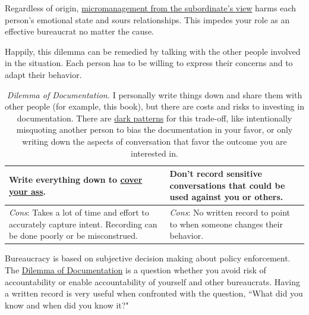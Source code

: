 Regardless of origin, \href{table:solution-provider}{micromanagement from the subordinate's view} harms each person's emotional state and sours relationships. This impedes your role as an effective bureaucrat no matter the cause.

Happily, this dilemma can be remedied by talking with the other people involved in the situation. Each person has to be willing to express their concerns and to adapt their behavior. 

\begin{center}
\begin{table}[H] %
\begin{tabular}{ | m{\dilemmatablewidth}| m{\dilemmatablewidth} | } 
  \hline
  \textbf{Write everything down to \href{https://en.wikipedia.org/wiki/Cover_your_ass}{cover your ass}.} &
  \textbf{Don't record sensitive conversations that could be used against you or others.} \\
  \hline
  \textit{Cons}: Takes a lot of time and effort to accurately capture intent. Recording can be done poorly or be misconstrued.  & 
  \textit{Cons}: No written record to point to when someone changes their behavior. \\
  \hline
\end{tabular}
\caption{\textit{Dilemma of Documentation.}
I personally write things down and share them with other people (for example, this book), but there are costs and risks to investing in documentation. There are \href{https://en.wikipedia.org/wiki/Dark_pattern}{dark patterns} for this trade-off, like intentionally misquoting another person to bias the documentation in your favor, or only writing down the aspects of conversation that favor the outcome you are interested in.  
}
\label{table:notes-or-no-notes}
\end{table}
\end{center}

Bureaucracy is based on subjective decision making about policy enforcement. The \href{table:notes-or-no-notes}{Dilemma of Documentation} is a question whether you avoid risk of accountability or enable accountability of yourself and other bureaucrats. Having a written record is very useful when confronted with the question, ``What did you know and when did you know it?"

